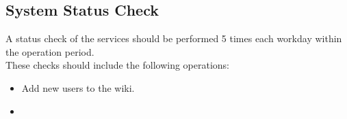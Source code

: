 \subsection{System Status Check}
A status check of the services should be performed 5 times each workday within the operation period.\\
These checks should include the following operations:
\begin{itemize}
\item Add new users to the wiki.
\item 
\end{itemize}